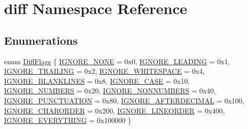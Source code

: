 \hypertarget{namespacediff}{}\section{diff Namespace Reference}
\label{namespacediff}
\subsection*{Enumerations}
\begin{DoxyCompactItemize}
\item 
enum \mbox{\hyperlink{namespacediff_ab3b1c38517a62ce7edefba7b93b406dd}{Diff\+Flags}} \{ \mbox{\hyperlink{namespacediff_ab3b1c38517a62ce7edefba7b93b406ddad0f7243da8aa7c7d8ff1d3ec921a40b4}{I\+G\+N\+O\+R\+E\+\_\+\+N\+O\+NE}} = 0x0, 
\mbox{\hyperlink{namespacediff_ab3b1c38517a62ce7edefba7b93b406dda36178024b8ebb050729793dd32e0b1a9}{I\+G\+N\+O\+R\+E\+\_\+\+L\+E\+A\+D\+I\+NG}} = 0x1, 
\mbox{\hyperlink{namespacediff_ab3b1c38517a62ce7edefba7b93b406dda4cf05931c8f25fb17d9f490c6bd67d70}{I\+G\+N\+O\+R\+E\+\_\+\+T\+R\+A\+I\+L\+I\+NG}} = 0x2, 
\mbox{\hyperlink{namespacediff_ab3b1c38517a62ce7edefba7b93b406ddab94634739aa9d0705e2eb7976a969a20}{I\+G\+N\+O\+R\+E\+\_\+\+W\+H\+I\+T\+E\+S\+P\+A\+CE}} = 0x4, 
\mbox{\hyperlink{namespacediff_ab3b1c38517a62ce7edefba7b93b406ddafb3c9078d1a73b062d0b08be343f7126}{I\+G\+N\+O\+R\+E\+\_\+\+B\+L\+A\+N\+K\+L\+I\+N\+ES}} = 0x8, 
\mbox{\hyperlink{namespacediff_ab3b1c38517a62ce7edefba7b93b406dda743829c4dd20c98f1a4db5f83106d839}{I\+G\+N\+O\+R\+E\+\_\+\+C\+A\+SE}} = 0x10, 
\mbox{\hyperlink{namespacediff_ab3b1c38517a62ce7edefba7b93b406ddadb9d907f4925e58514022d03c646ed2e}{I\+G\+N\+O\+R\+E\+\_\+\+N\+U\+M\+B\+E\+RS}} = 0x20, 
\mbox{\hyperlink{namespacediff_ab3b1c38517a62ce7edefba7b93b406ddabf5793c00c9ca596c7743a9a9704b7f7}{I\+G\+N\+O\+R\+E\+\_\+\+N\+O\+N\+N\+U\+M\+B\+E\+RS}} = 0x40, 
\mbox{\hyperlink{namespacediff_ab3b1c38517a62ce7edefba7b93b406dda84e6a2f9f288157ed7a207dc744e1d46}{I\+G\+N\+O\+R\+E\+\_\+\+P\+U\+N\+C\+T\+U\+A\+T\+I\+ON}} = 0x80, 
\mbox{\hyperlink{namespacediff_ab3b1c38517a62ce7edefba7b93b406dda2cb6b009fb93f98c0d82e64524454f3f}{I\+G\+N\+O\+R\+E\+\_\+\+A\+F\+T\+E\+R\+D\+E\+C\+I\+M\+AL}} = 0x100, 
\mbox{\hyperlink{namespacediff_ab3b1c38517a62ce7edefba7b93b406dda8382f8ecacc40734d5aa68059769d486}{I\+G\+N\+O\+R\+E\+\_\+\+C\+H\+A\+R\+O\+R\+D\+ER}} = 0x200, 
\mbox{\hyperlink{namespacediff_ab3b1c38517a62ce7edefba7b93b406dda3dd3d9c71b29c78f94e9104e8e4d08f9}{I\+G\+N\+O\+R\+E\+\_\+\+L\+I\+N\+E\+O\+R\+D\+ER}} = 0x400, 
\mbox{\hyperlink{namespacediff_ab3b1c38517a62ce7edefba7b93b406dda1023cdec61bceee745fffdc581f0d366}{I\+G\+N\+O\+R\+E\+\_\+\+E\+V\+E\+R\+Y\+T\+H\+I\+NG}} = 0x100000
 \}
\end{DoxyCompactItemize}

